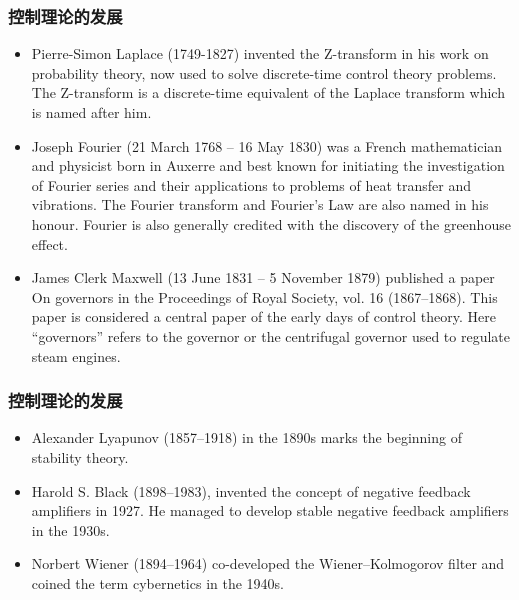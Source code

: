 \documentclass{article}
\begin{document}
\begin{frame}
\frametitle{控制理论的发展}
\label{sec-1-1-7}

\begin{itemize}
\item <1> Pierre-Simon Laplace (1749-1827) invented the Z-transform in his work on probability theory, now used to solve discrete-time control theory problems. The Z-transform is a discrete-time equivalent of the Laplace transform which is named after him.
\item <2> Joseph Fourier (21 March 1768 – 16 May 1830) was a French mathematician and physicist born in Auxerre and best known for initiating the investigation of Fourier series and their applications to problems of heat transfer and vibrations. The Fourier transform and Fourier's Law are also named in his honour. Fourier is also generally credited with the discovery of the greenhouse effect.
\item <3> James Clerk Maxwell (13 June 1831 – 5 November 1879) published a paper On governors in the Proceedings of Royal Society, vol. 16 (1867–1868). This paper is considered a central paper of the early days of control theory. Here ``governors'' refers to the governor or the centrifugal governor used to regulate steam engines.
\end{itemize}
\end{frame}
\begin{frame}
\frametitle{控制理论的发展}
\label{sec-1-1-8}

\begin{itemize}
\item <1> Alexander Lyapunov (1857–1918) in the 1890s marks the beginning of stability theory.
\item <2> Harold S. Black (1898–1983), invented the concept of negative feedback amplifiers in 1927. He managed to develop stable negative feedback amplifiers in the 1930s.
\item <3> Norbert Wiener (1894–1964) co-developed the Wiener–Kolmogorov filter and coined the term cybernetics in the 1940s.
\end{itemize}
\end{frame}
\end{document}
